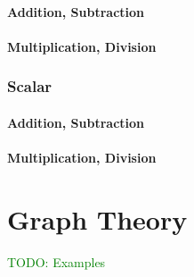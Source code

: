 \paragraph{Addition, Subtraction}

\paragraph{Multiplication, Division}

\subsubsection{Scalar}

\paragraph{Addition, Subtraction}

\paragraph{Multiplication, Division}



\section{Graph Theory}

\textcolor{green}{TODO: Examples}